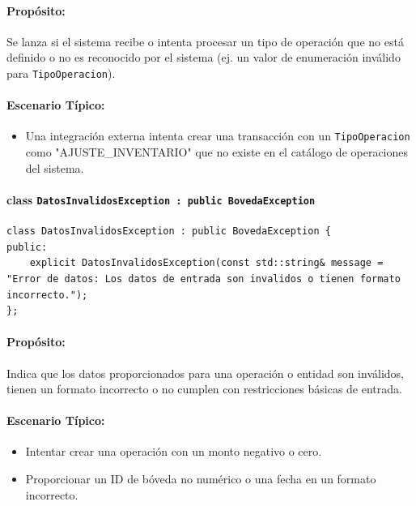 \documentclass{article}
\newcommand{\inlinecode}[1]{\texttt{#1}}
\begin{document}
\paragraph*{Propósito:} Se lanza si el sistema recibe o intenta procesar un tipo de operaci\'on que no est\'a definido o no es reconocido por el sistema (ej. un valor de enumeraci\'on inv\'alido para \inlinecode{TipoOperacion}).

\paragraph*{Escenario Típico:}
\begin{itemize}
    \item Una integraci\'on externa intenta crear una transacci\'on con un \inlinecode{TipoOperacion} como "AJUSTE\_INVENTARIO" que no existe en el cat\'alogo de operaciones del sistema.
\end{itemize}

\paragraph*{\textbf{class \inlinecode{DatosInvalidosException : public BovedaException}}}
\vspace{2mm} %
\begin{lstlisting}
class DatosInvalidosException : public BovedaException {
public:
    explicit DatosInvalidosException(const std::string& message = "Error de datos: Los datos de entrada son invalidos o tienen formato incorrecto.");
};
\end{lstlisting}
\paragraph*{Propósito:} Indica que los datos proporcionados para una operaci\'on o entidad son inv\'alidos, tienen un formato incorrecto o no cumplen con restricciones b\'asicas de entrada.

\paragraph*{Escenario Típico:}
\begin{itemize}
    \item Intentar crear una operaci\'on con un monto negativo o cero.
    \item Proporcionar un ID de b\'oveda no num\'erico o una fecha en un formato incorrecto.
\end{itemize}
\end{document}
